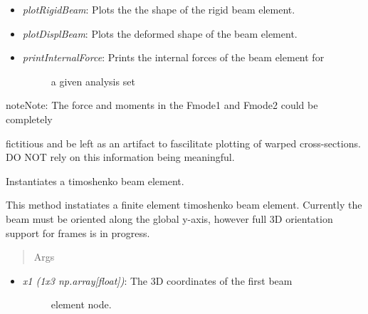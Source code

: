 \documentclass[letterpaper,10pt,english]{sphinxmanual}
\begin{document}
\begin{fulllineitems}
\begin{itemize}
\begin{description}
\end{description}

\item {} 
\emph{plotRigidBeam}: Plots the the shape of the rigid beam element.

\item {} 
\emph{plotDisplBeam}: Plots the deformed shape of the beam element.

\item {} \begin{description}
\item[{\emph{printInternalForce}: Prints the internal forces of the beam element for}] \leavevmode
a given analysis set

\end{description}

\end{itemize}

\begin{notice}{note}{Note:}
The force and moments in the Fmode1 and Fmode2 could be completely
\end{notice}

fictitious and be left as an artifact to fascilitate plotting of warped
cross-sections. DO NOT rely on this information being meaningful.

\begin{fulllineitems}
\label{structures:AeroComBAT.Structures.TBeam.__init__}
Instantiates a timoshenko beam element.

This method instatiates a finite element timoshenko beam element.
Currently the beam must be oriented along the global y-axis, however
full 3D orientation support for frames is in progress.
\begin{quote}\begin{description}
\item[{Args}] \leavevmode
\end{description}\end{quote}
\begin{itemize}
\item {} \begin{description}
\item[{\emph{x1 (1x3 np.array{[}float{]})}: The 3D coordinates of the first beam}] \leavevmode
element node.

\end{description}


\end{itemize}
\end{fulllineitems}
\end{fulllineitems}
\end{document}
